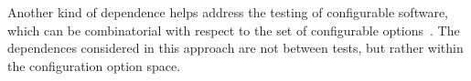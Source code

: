 
Another kind of dependence helps address
the testing of configurable software, which can be combinatorial with respect to the
set of configurable options~\cite{Cohen97theaetg,Cohen:2003}.  
The dependences considered in this approach are not between tests, but rather within
the configuration option space.


%
%
%




